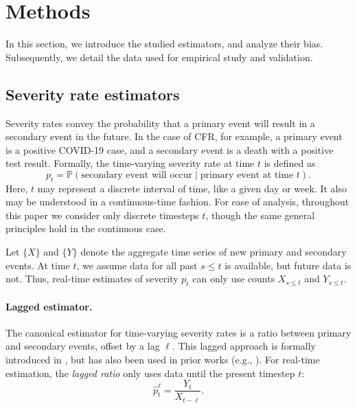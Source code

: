 \documentclass{article}
\renewcommand{\hat}{\widehat} %
\newcommand{\given}{\; \vert \;}
\newcommand{\djmcomment}[1]{{\color{teal}[DJM: #1]}}
\newcommand{\jmgcomment}[1]{{\color{cyan}[JMG: #1]}}
\begin{document}
\section{Methods}\label{sec:methods}
In this section, we introduce the studied estimators, and analyze their bias. Subsequently, we detail the data used for empirical study and validation. 

\subsection{Severity rate estimators}\label{sec:defs}

Severity rates convey the probability that a primary event will result in a secondary event in the future. 
In the case of CFR, for example, a primary event is a positive COVID-19 case, and a secondary event is a death with a positive test result.
Formally, the time-varying severity rate at time $t$ is defined as
\begin{equation}\label{eq:severity}
    p_t = \mathbb{P}(\text{secondary event will occur}\given\text{primary event at time }t).
\end{equation}
Here, $t$ may represent a discrete interval of time, like a given day or week. It also may be understood in a continuous-time fashion. 
For ease of analysis, throughout this paper we consider only discrete timesteps $t$, though the same general principles hold in the continuous case. 

Let $\{X\}$ and $\{Y\}$ denote the aggregate time series of new primary and secondary events. %
At time $t$, we assume data for all past $s\leq t$ is available, but future data is not. Thus, real-time estimates of severity $p_t$ can only use counts $X_{s\leq t}$ and $Y_{s\leq t}$. 

\paragraph{Lagged estimator.} 

The canonical estimator for time-varying severity rates is a ratio between primary and secondary events, offset by a lag $\ell$. 
This lagged approach is formally introduced in \citet{thomas2021estimating}, but has also been used in prior works (e.g., \citealp{germany,horita2022global,timevar_ifr,yuan2020monitoring,LIU2023100350,atlantic,wsj}). 
For real-time estimation, the \textit{lagged ratio} only uses data until the present timestep $t$: 
\begin{equation}\label{eq:lagged}
    \hat{p}_t^\ell = \frac{Y_t}{X_{t-\ell}}.
\end{equation}
\end{document}
